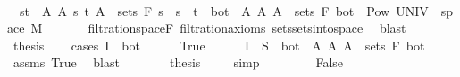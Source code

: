 \begin{isabellebody}
\ {\isacharminus}{\kern0pt}\isanewline
\ \ \isamarkupfalse%
\ {\isacharasterisk}{\kern0pt}{\isacharcolon}{\kern0pt}\ {\isachardoublequoteopen}{\isacharbraceleft}{\kern0pt}{\isacharbraceleft}{\kern0pt}s{\isacharless}{\kern0pt}{\isachardot}{\kern0pt}{\isachardot}{\kern0pt}t{\isacharbraceright}{\kern0pt}\ {\isasymtimes}\ A\ {\isacharbar}{\kern0pt}A\ s\ t{\isachardot}{\kern0pt}\ A\ {\isasymin}\ sets\ {\isacharparenleft}{\kern0pt}F\ s{\isacharparenright}{\kern0pt}\ {\isasymand}\ s\ {\isacharless}{\kern0pt}\ t{\isacharbraceright}{\kern0pt}\ {\isasymunion}\ {\isacharbraceleft}{\kern0pt}{\isacharbraceleft}{\kern0pt}bot{\isacharbraceright}{\kern0pt}\ {\isasymtimes}\ A\ {\isacharbar}{\kern0pt}A{\isachardot}{\kern0pt}\ A\ {\isasymin}\ sets\ {\isacharparenleft}{\kern0pt}F\ bot{\isacharparenright}{\kern0pt}{\isacharbraceright}{\kern0pt}\ {\isasymsubseteq}\ Pow\ {\isacharparenleft}{\kern0pt}UNIV\ {\isasymtimes}\ space\ M{\isacharparenright}{\kern0pt}{\isachardoublequoteclose}\ \isanewline
\ \ \ \ \isamarkupfalse%
\ filtration{\isachardot}{\kern0pt}space{\isacharunderscore}{\kern0pt}F\ filtration{\isacharunderscore}{\kern0pt}axioms\ sets{\isachardot}{\kern0pt}sets{\isacharunderscore}{\kern0pt}into{\isacharunderscore}{\kern0pt}space\ \isamarkupfalse%
\ blast\isanewline
\ \ \isamarkupfalse%
\ {\isacharquery}{\kern0pt}thesis\isanewline
\ \ \isamarkupfalse%
\ {\isacharparenleft}{\kern0pt}cases\ {\isachardoublequoteopen}I\ {\isacharequal}{\kern0pt}\ {\isacharbraceleft}{\kern0pt}bot{\isacharbraceright}{\kern0pt}{\isachardoublequoteclose}{\isacharparenright}{\kern0pt}\isanewline
\ \ \ \ \isamarkupfalse%
\ True\isanewline
\ \ \ \ \isamarkupfalse%
\ {\isachardoublequoteopen}I\ {\isasymtimes}\ S\ {\isasymin}\ {\isacharbraceleft}{\kern0pt}{\isacharbraceleft}{\kern0pt}bot{\isacharbraceright}{\kern0pt}\ {\isasymtimes}\ A\ {\isacharbar}{\kern0pt}A{\isachardot}{\kern0pt}\ A\ {\isasymin}\ sets\ {\isacharparenleft}{\kern0pt}F\ bot{\isacharparenright}{\kern0pt}{\isacharbraceright}{\kern0pt}{\isachardoublequoteclose}\ \isamarkupfalse%
\ assms\ True\ \isamarkupfalse%
\ blast\isanewline
\ \ \ \ \isamarkupfalse%
\ \isamarkupfalse%
\ {\isacharquery}{\kern0pt}thesis\ \isamarkupfalse%
\ {\isacharasterisk}{\kern0pt}\ \isamarkupfalse%
\ simp\isanewline
\ \ \isamarkupfalse%
\isanewline
\ \ \ \ \isamarkupfalse%
\ False\isanewline
\ \ \ \ \isamarkupfalse%

\end{isabellebody}
